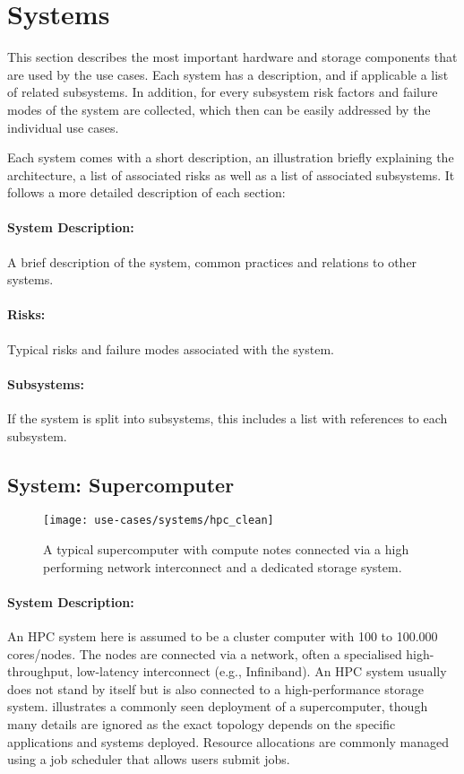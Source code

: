 \clearpage
\section{Systems}
\label{sec:use cases/systems}


This section describes the most important hardware and storage components that are used by the use cases.
Each system has a description, and if applicable a list of related subsystems.
In addition, for every subsystem risk factors and failure modes of the system are collected, which then can be easily addressed by the individual use cases.

Each system comes with a short description, an illustration briefly explaining the architecture, a list of associated risks as well as a list of associated subsystems.
It follows a more detailed description of each section:

\paragraph{System Description:} A brief description of the system, common practices and relations to other systems.
\paragraph{Risks:} Typical risks and failure modes associated with the system.
\paragraph{Subsystems:} If the system is split into subsystems, this includes a list with references to each subsystem.

\subsection{System: Supercomputer}
\label{System: Supercomputer}

\begin{figure}
	\centering
	\texttt{[image: use-cases/systems/hpc\_clean]}
	\caption{A typical supercomputer with compute notes connected via a high performing network interconnect and a dedicated storage system.}
	\label{fig:system supercomputer}
\end{figure}


\paragraph{System Description:}
An HPC system here is assumed to be a cluster computer with 100 to 100.000 cores/nodes.
The nodes are connected via a network, often a specialised high-throughput, low-latency interconnect (e.g., Infiniband). An HPC system usually does not stand by itself but is also connected to a high-performance storage system.
 illustrates a commonly seen deployment of a supercomputer, though many details are ignored as the exact topology depends on the specific applications and systems deployed.
Resource allocations are commonly managed using a job scheduler that allows users submit jobs.


